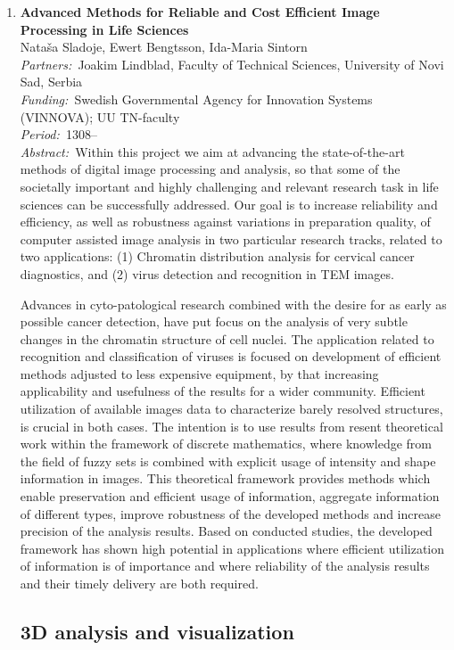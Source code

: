 \documentclass[10pt, a4paper]{article}
\newcommand{\aabstract}[1]{\emph{Abstract:~}#1}
\newcommand{\ffunding}[1]{\emph{Funding:~}#1\\}
\newcommand{\ppartners}[1]{\emph{Partners:~}#1\\}
\newcommand{\pperiod}[1]{\emph{Period:~}#1\\}
\begin{document}
{\begin{enumerate}

\item
\label{proj:high_prec_lifeSci}
\textbf{Advanced Methods for Reliable and Cost Efficient Image Processing in Life Sciences}\\
Nata\v{s}a Sladoje, Ewert Bengtsson,  Ida-Maria Sintorn  \\
\ppartners{Joakim Lindblad, Faculty of Technical Sciences, University of Novi Sad, Serbia}
\ffunding{Swedish Governmental Agency for Innovation Systems (VINNOVA); UU TN-faculty }
\pperiod{1308--}
\aabstract{Within this project we aim at advancing the state-of-the-art methods of digital image processing and analysis, so that some of the societally important and highly challenging and relevant research task in life sciences can be successfully addressed.  Our goal is to increase reliability and efficiency, as well as robustness against variations in preparation quality, of computer assisted image analysis in two particular research tracks, related to two applications: (1) Chromatin distribution analysis for cervical cancer diagnostics, and (2) virus detection and recognition in TEM images. 
	
Advances in cyto-patological research combined with the desire for as early as possible cancer detection, have put focus on the analysis of very subtle changes in the chromatin structure of cell nuclei. The application related to recognition and classification of viruses	is focused on development of efficient methods adjusted to less expensive equipment, by that increasing applicability and usefulness of the results for a wider community. Efficient utilization of available images data to characterize barely resolved structures, is crucial in both cases. The intention is to use results from resent theoretical work within the framework of discrete mathematics, where  knowledge from the field of fuzzy sets is combined with explicit usage of intensity and shape information in images. This theoretical framework provides methods which enable preservation and efficient usage of information, aggregate information of different types, improve robustness of the developed methods and increase precision of the analysis results. Based on conducted studies, the developed framework has shown high potential in applications where efficient utilization of information is of importance and where reliability of the analysis results and their timely delivery are both required. }

\clearpage

\subsection{3D analysis and visualization}


\end{enumerate}}
\end{document}
